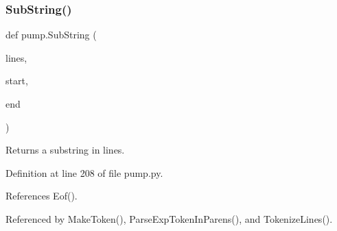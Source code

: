 \subsubsection{\texorpdfstring{Sub\+String()}{SubString()}}
{\footnotesize\ttfamily def pump.\+Sub\+String (\begin{DoxyParamCaption}\item[{}]{lines,  }\item[{}]{start,  }\item[{}]{end }\end{DoxyParamCaption})}

\begin{DoxyVerb}Returns a substring in lines.\end{DoxyVerb}
 

Definition at line 208 of file pump.\+py.



References Eof().



Referenced by Make\+Token(), Parse\+Exp\+Token\+In\+Parens(), and Tokenize\+Lines().


